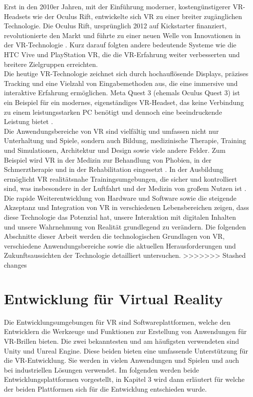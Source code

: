 \noindent
Erst in den 2010er Jahren, mit der Einführung moderner, kostengünstigerer VR-Headsets wie der Oculus Rift, entwickelte sich VR zu einer breiter zugänglichen Technologie. Die Oculus Rift, ursprünglich 2012 auf Kickstarter finanziert, revolutionierte den Markt und führte zu einer neuen Welle von Innovationen in der VR-Technologie \cite{luckey2012}. Kurz darauf folgten andere bedeutende Systeme wie die HTC Vive und PlayStation VR, die die VR-Erfahrung weiter verbesserten und breitere Zielgruppen erreichten.
\\

\noindent
Die heutige VR-Technologie zeichnet sich durch hochauflösende Displays, präzises Tracking und eine Vielzahl von Eingabemethoden aus, die eine immersive und interaktive Erfahrung ermöglichen. Meta Quest 3 (ehemals Oculus Quest 3) ist ein Beispiel für ein modernes, eigenständiges VR-Headset, das keine Verbindung zu einem leistungsstarken PC benötigt und dennoch eine beeindruckende Leistung bietet \cite{meta2023}.
\\

\noindent
Die Anwendungsbereiche von VR sind vielfältig und umfassen nicht nur Unterhaltung und Spiele, sondern auch Bildung, medizinische Therapie, Training und Simulationen, Architektur und Design sowie viele andere Felder. Zum Beispiel wird VR in der Medizin zur Behandlung von Phobien, in der Schmerztherapie und in der Rehabilitation eingesetzt \cite{rizzo2017}. In der Ausbildung ermöglicht VR realitätsnahe Trainingsumgebungen, die sicher und kontrolliert sind, was insbesondere in der Luftfahrt und der Medizin von großem Nutzen ist \cite{huang2018}.
\\

\noindent
Die rapide Weiterentwicklung von Hardware und Software sowie die steigende Akzeptanz und Integration von VR in verschiedenen Lebensbereichen zeigen, dass diese Technologie das Potenzial hat, unsere Interaktion mit digitalen Inhalten und unsere Wahrnehmung von Realität grundlegend zu verändern. Die folgenden Abschnitte dieser Arbeit werden die technologischen Grundlagen von VR, verschiedene Anwendungsbereiche sowie die aktuellen Herausforderungen und Zukunftsaussichten der Technologie detailliert untersuchen.
>>>>>>> Stashed changes

\section{Entwicklung für Virtual Reality}
Die Entwicklungsumgebungen für VR sind Softwareplattformen, welche den Entwicklern die Werkzeuge und Funktionen zur Erstellung von Anwendungen für VR-Brillen bieten. Die zwei bekanntesten und am häufigsten verwendeten sind Unity und Unreal Engine. Diese beiden bieten eine umfassende Unterstützung für die VR-Entwicklung. Sie werden in vielen Anwendungen und Spielen und auch bei industriellen Lösungen verwendet. Im folgenden werden beide Entwicklungsplattformen vorgestellt, in Kapitel 3 wird dann erläutert für welche der beiden Plattformen sich für die Entwicklung entschieden wurde.
